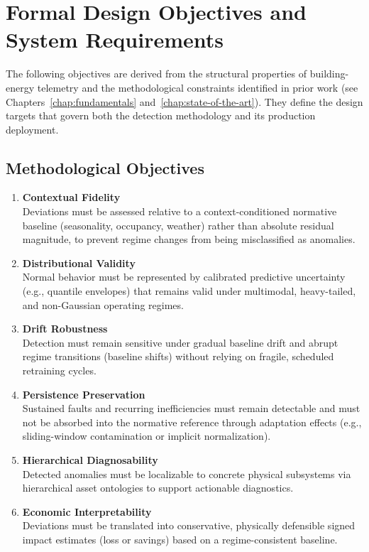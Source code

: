 \section{Formal Design Objectives and System Requirements}

The following objectives are derived from the structural properties of building-energy
telemetry and the methodological constraints identified in prior work (see
Chapters~\ref{chap:fundamentals} and~\ref{chap:state-of-the-art}). They define the design
targets that govern both the detection methodology and its production deployment.

\subsection{Methodological Objectives}
{\renewcommand{\labelenumi}{\textbf{O\arabic{enumi}:}}
\begin{enumerate}
	\item \textbf{Contextual Fidelity}\label{obj:contextual-fidelity}\\
	Deviations must be assessed relative to a context-conditioned normative baseline
	(seasonality, occupancy, weather) rather than absolute residual magnitude, to
	prevent regime changes from being misclassified as anomalies.

	\item \textbf{Distributional Validity}\label{obj:distributional-validity}\\
	Normal behavior must be represented by calibrated predictive uncertainty
	(e.g., quantile envelopes) that remains valid under multimodal, heavy-tailed, and
	non-Gaussian operating regimes.

	\item \textbf{Drift Robustness}\label{obj:drift-robustness}\\
	Detection must remain sensitive under gradual baseline drift and abrupt regime
	transitions (baseline shifts) without relying on fragile, scheduled retraining cycles.

	\item \textbf{Persistence Preservation}\label{obj:persistence-preservation}\\
	Sustained faults and recurring inefficiencies must remain detectable and must not
	be absorbed into the normative reference through adaptation effects (e.g., sliding-window
	contamination or implicit normalization).

	\item \textbf{Hierarchical Diagnosability}\label{obj:hierarchical-diagnosability}\\
	Detected anomalies must be localizable to concrete physical subsystems via
	hierarchical asset ontologies to support actionable diagnostics.

	\item \textbf{Economic Interpretability}\label{obj:economic-interpretability}\\
	Deviations must be translated into conservative, physically defensible signed
	impact estimates (loss or savings) based on a regime-consistent baseline.
\end{enumerate}}

